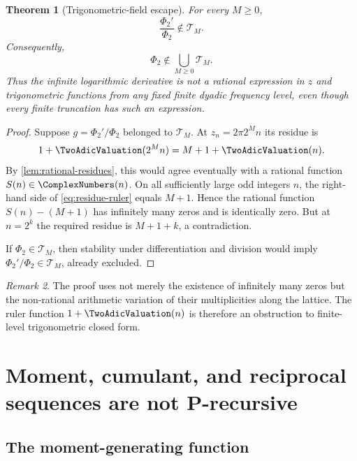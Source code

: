 \documentclass[11pt]{article}
\numberwithin{equation}{section}
\newtheorem{theorem}{Theorem}[section]
\theoremstyle{definition}
\theoremstyle{remark}
\newtheorem{remark}[theorem]{Remark}
\begin{document}
\begin{theorem}[Trigonometric-field escape]
\label{thm:field-escape}
For every $M\ge0$,
\begin{equation}
 \boxed{
 \frac{\Phi_2'}{\Phi_2}\notin\mathcal T_M.}
 \label{eq:log-derivative-escape}
\end{equation}
Consequently,
\begin{equation}
 \Phi_2\notin\bigcup_{M\ge0}\mathcal T_M.
 \label{eq:Phi-field-escape}
\end{equation}
Thus the infinite logarithmic derivative is not a rational expression in $z$
and trigonometric functions from any fixed finite dyadic frequency level,
even though every finite truncation has such an expression.
\end{theorem}
\begin{proof}
Suppose $g=\Phi_2'/\Phi_2$ belonged to $\mathcal T_M$.  At
$z_n=2\pi2^Mn$ its residue is
\begin{equation}
 1+\TwoAdicValuation(2^Mn)=M+1+\TwoAdicValuation(n).
 \label{eq:residue-ruler}
\end{equation}
By \cref{lem:rational-residues}, this would agree eventually with a rational
function $S(n)\in\ComplexNumbers(n)$.  On all sufficiently large odd integers $n$, the
right-hand side of \eqref{eq:residue-ruler} equals $M+1$.  Hence the rational
function $S(n)-(M+1)$ has infinitely many zeros and is identically zero.  But
at $n=2^k$ the required residue is $M+1+k$, a contradiction.

If $\Phi_2\in\mathcal T_M$, then stability under differentiation and division
would imply $\Phi_2'/\Phi_2\in\mathcal T_M$, already excluded.
\end{proof}

\begin{remark}
The proof uses not merely the existence of infinitely many zeros but the
non-rational arithmetic variation of their multiplicities along the lattice.
The ruler function $1+\TwoAdicValuation(n)$ is therefore an obstruction to finite-level
trigonometric closed form.
\end{remark}

\section{Moment, cumulant, and reciprocal sequences are not P-recursive}
\label{sec:moment-nonprecursive}

\subsection{The moment-generating function}
\end{document}

